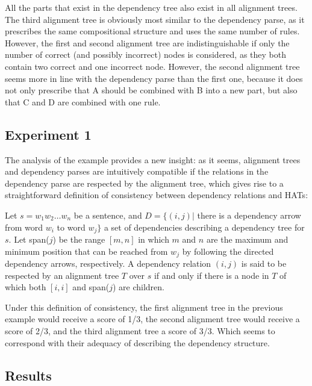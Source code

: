 \documentclass[hidelinks]{report}
\begin{document}
All the parts that exist in the dependency tree also exist in all alignment trees. The third alignment tree is obviously most similar to the dependency parse, as it prescribes the same compositional structure and uses the same number of rules. However, the first and second alignment tree are indistinguishable if only the number of correct (and possibly incorrect) nodes is considered, as they both contain two correct and one incorrect node. However, the second alignment tree seems more in line with the dependency parse than the first one, because it does not only prescribe that A should be combined with B into a new part, but also that C and D are combined with one rule.

\subsection{Experiment 1}

The analysis of the example provides a new insight: as it seems, alignment trees and dependency parses are intuitively compatible if the relations in the dependency parse are respected by the alignment tree, which gives rise to a straightforward definition of consistency between dependency relations and HATs:

\begin{definition}\label{def:depHAT}
Let $s = w_1 w_2 \dots w_n$ be a sentence, and $D = \{ (i,j) |$ there is a dependency arrow from word $w_i$ to word $w_j \}$ a set of dependencies describing a dependency tree for $s$. Let span($j$) be the range $[m,n]$ in which $m$ and $n$ are the maximum and minimum position that can be reached from $w_j$ by following the directed dependency arrows, respectively. A dependency relation $(i,j)$ is said to be respected by an alignment tree $T$ over $s$ if and only if there is a node in $T$ of which both $[i,i]$ and span($j$) are children.
\end{definition}

Under this definition of consistency, the first alignment tree in the previous example would receive a score of 1/3, the second alignment tree would receive a score of 2/3, and the third alignment tree a score of 3/3. Which seems to correspond with their adequacy of describing the dependency structure.

\subsection{Results}
\end{document}

